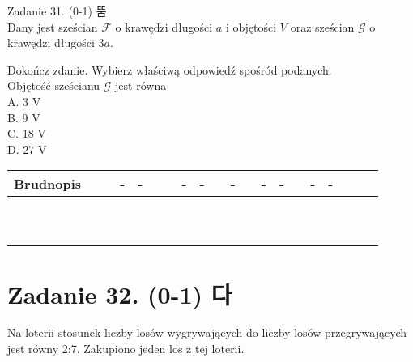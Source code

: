 \documentclass[10pt]{article}
\begin{document}
Zadanie 31. (0-1) 뚬\\
Dany jest sześcian \(\mathcal{F}\) o krawędzi długości \(a\) i objętości \(V\) oraz sześcian \(\mathcal{G}\) o krawędzi długości \(3 a\).

Dokończ zdanie. Wybierz właściwą odpowiedź spośród podanych.\\
Objętość sześcianu \(\mathcal{G}\) jest równa\\
A. 3 V\\
B. 9 V\\
C. 18 V\\
D. 27 V

\begin{center}
\begin{tabular}{|c|c|c|c|c|c|c|c|c|c|c|c|c|c|c|c|c|c|c|c|c|c|c|}
\hline
\multicolumn{4}{|l|}{Brudnopis} &  &  & - & - &  &  & - & - &  & - &  & - & - &  & - & - &  &  &  \\
\hline
 &  &  &  &  &  &  &  &  &  &  &  &  &  &  &  &  &  &  &  &  &  &  \\
\hline
 &  &  &  &  &  &  &  &  &  &  &  &  &  &  &  &  &  &  &  &  &  &  \\
\hline
 &  &  &  &  &  &  &  &  &  &  &  &  &  &  &  &  &  &  &  &  &  &  \\
\hline
 &  &  &  &  &  &  &  &  &  &  &  &  &  &  &  &  &  &  &  &  &  &  \\
\hline
 &  &  &  &  &  &  &  &  &  &  &  &  &  &  &  &  &  &  &  &  &  &  \\
\hline
 &  &  &  &  &  &  &  &  &  &  &  &  &  &  &  &  &  &  &  &  &  &  \\
\hline
 &  &  &  &  &  &  &  &  &  &  &  &  &  &  &  &  &  &  &  &  &  &  \\
\hline
 &  &  &  &  &  &  &  &  &  &  &  &  &  &  &  &  &  &  &  &  &  &  \\
\hline
 &  &  &  &  &  &  &  &  &  &  &  &  &  &  &  &  &  &  &  &  &  &  \\
\hline
 &  &  &  &  &  &  &  &  &  &  &  &  &  &  &  &  &  &  &  &  &  &  \\
\hline
\end{tabular}
\end{center}

\section*{Zadanie 32. (0-1) 다}
Na loterii stosunek liczby losów wygrywających do liczby losów przegrywających jest równy 2:7. Zakupiono jeden los z tej loterii.
\end{document}
